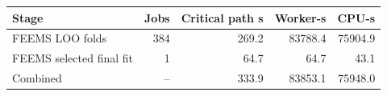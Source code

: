 \begin{tabular}{lrrrr}
\toprule
Stage & Jobs & Critical path s & Worker-s & CPU-s \\
\midrule
FEEMS LOO folds & 384 & 269.2 & 83788.4 & 75904.9 \\
FEEMS selected final fit & 1 & 64.7 & 64.7 & 43.1 \\
Combined & -- & 333.9 & 83853.1 & 75948.0 \\
\bottomrule
\end{tabular}
